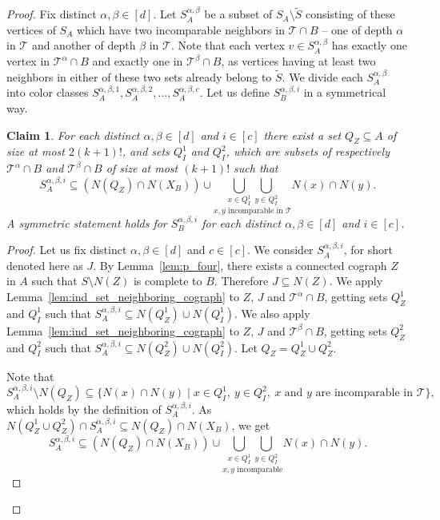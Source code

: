\documentclass[11pt,a4paper]{article}
\newtheorem{claim}[theorem]{Claim}
\theoremstyle{definition}
\def\T{\mathcal{T}}
\begin{document}
\begin{proof}
Fix distinct $\alpha, \beta\in[d]$. Let $S_A^{\alpha,\beta}$ be a subset of $S_A\setminus \widetilde{S}$ consisting of these vertices of $S_A$ which have two incomparable neighbors in $\T\cap B$ -- one of depth $\alpha$ in $\T$ and another of depth $\beta$ in $\T$. 
Note that each vertex $v\in S^{\alpha, \beta}_A$ has exactly one vertex in $\T^{\alpha}\cap B$ and exactly one in $\T^\beta\cap B$, as vertices having at least two neighbors in either of these two sets already belong to $\widetilde{S}$. We divide each $S_A^{\alpha,\beta}$ into color classes $S_A^{\alpha,\beta,1}, S_A^{\alpha,\beta, 2}, \dots, S_A^{\alpha,\beta,c}$. Let us define $S_B^{\alpha,\beta, i}$ in a symmetrical way.
\begin{claim}\label{cl:two_incomparable_neighbors_on_different_levels}
    For each distinct $\alpha, \beta\in[d]$ and $i\in[c]$ there exist a set $Q_Z \subseteq A$
    of size at most $2(k+1)!$, and sets $Q_I^1$ and $Q_I^2$, which are subsets of respectively $\T^\alpha\cap B$ and $\T^\beta\cap B$ of size at most $(k+1)!$ such that
    $$S_A^{\alpha,\beta, i}\subseteq \left(N(Q_Z)\cap N(X_B)\right)\cup \underset{x,y \text{ incomparable in }\T}{\bigcup_{x\in Q_I^1}\bigcup_{y\in Q_I^2}} N(x)\cap N(y).$$
    A symmetric statement holds for $S_B^{\alpha,\beta,i}$ for each distinct $\alpha,\beta\in[d]$ and $i\in[c]$.
\end{claim}
\begin{proof}
    Let us fix distinct $\alpha, \beta\in[d]$ and $c\in[c]$. We consider $S_A^{\alpha,\beta, i}$, for short denoted here as $J$. By Lemma~\ref{lem:p_four}, there exists a connected cograph $Z$ in $A$ such that $S\setminus N(Z)$ is complete to $B$. Therefore $J\subseteq N(Z)$. We apply Lemma~\ref{lem:ind_set_neighboring_cograph} to $Z$, $J$ and $\T^\alpha\cap B$, getting sets $Q_Z^{1}$ and $Q_I^{1}$ such that $S_A^{\alpha, \beta, i}\subseteq N(Q_Z^{1})\cup N(Q_I^{1})$.
    We also apply Lemma~\ref{lem:ind_set_neighboring_cograph} to $Z$, $J$ and $\T^\beta\cap B$, getting sets $Q_Z^2$ and $Q_I^2$ such that $S_A^{\alpha, \beta, i}\subseteq N(Q_Z^{2})\cup N(Q_I^{2})$. Let $Q_Z = Q_Z^1 \cup Q_Z^2$.

    Note that 
    \[ S^{\alpha, \beta, i}_A \setminus N(Q_Z) \subseteq \{N(x)\cap N(y) \mid x \in Q_I^1,\ y \in Q_I^2,\ x \text{ and } y \text{ are incomparable in } \T\}, \]
    which holds by the definition of $S^{\alpha, \beta, i}_A$. As $N(Q_Z^1\cup Q_Z^2)\cap S_A^{\alpha, \beta, i} \subseteq N(Q_Z)\cap N(X_B)$, we get 
    $$S_A^{\alpha,\beta, i}\subseteq \left(N(Q_Z)\cap N(X_B)\right)\cup \underset{x,y \text{ incomparable}}{\bigcup_{x\in Q_I^1}\bigcup_{y\in Q_I^2}} N(x)\cap N(y).$$


\end{proof}
\end{proof}
\end{document}
